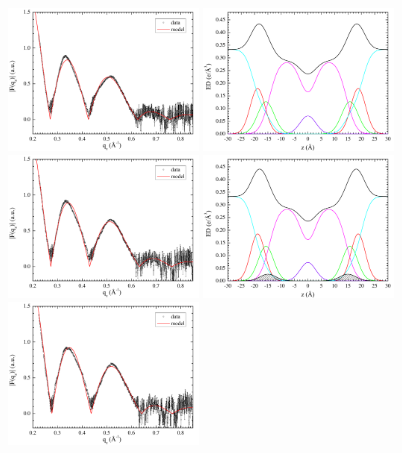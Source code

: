 \begin{figure}[htbp]
  \centering
  \includegraphics[width=0.45\textwidth,valign=t]{figures/Tat/SDP_Results/XFF/DOPCDOPE1to1_XFF1}
  \includegraphics[width=0.45\textwidth,valign=t]{./figures/Tat/SDP_Results/EDP/DOPCDOPE1to1_EDP1}
  \includegraphics[width=0.45\textwidth,valign=t]{figures/Tat/SDP_Results/XFF/DOPCDOPE1to1_Tat_62to1_3p0_XFF1}
  \includegraphics[width=0.45\textwidth,valign=t]{./figures/Tat/SDP_Results/EDP/DOPCDOPE1to1_Tat_62to1_3p0_EDP1}
  \includegraphics[width=0.45\textwidth,valign=t]{figures/Tat/SDP_Results/XFF/DOPCDOPE1to1_Tat_28to1_3p0_XFF1}

\end{figure}
